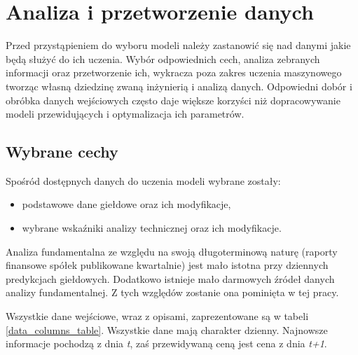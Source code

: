 \documentclass[a4paper, twoside, 11pt, openright]{article}
\begin{document}
\bigskip



\newpage

\section{Analiza i przetworzenie danych}

Przed przystąpieniem do wyboru modeli należy zastanowić się nad danymi jakie będą służyć do ich uczenia. Wybór odpowiednich cech, analiza zebranych informacji oraz przetworzenie ich, wykracza poza zakres uczenia maszynowego tworząc własną dziedzinę zwaną inżynierią i analizą danych. Odpowiedni dobór i obróbka danych wejściowych często daje większe korzyści niż dopracowywanie modeli przewidujących i optymalizacja ich parametrów. 

\subsection{Wybrane cechy}

Spośród dostępnych danych do uczenia modeli wybrane zostały: 
\begin{itemize}
\item podstawowe dane giełdowe oraz ich modyfikacje,
\item wybrane wskaźniki analizy technicznej oraz ich modyfikacje.
\end{itemize}

Analiza fundamentalna ze względu na swoją długoterminową naturę (raporty finansowe spółek publikowane kwartalnie) jest mało istotna przy dziennych predykcjach giełdowych. Dodatkowo istnieje mało darmowych źródeł danych analizy fundamentalnej. Z tych względów zostanie ona pominięta w tej pracy.

\bigskip

Wszystkie dane wejściowe, wraz z opisami, zaprezentowane są w tabeli \ref{data_columns_table}. Wszystkie dane mają charakter dzienny. Najnowsze informacje pochodzą z dnia \textit{t}, zaś przewidywaną ceną jest cena z dnia \textit{t+1}.
\end{document}
